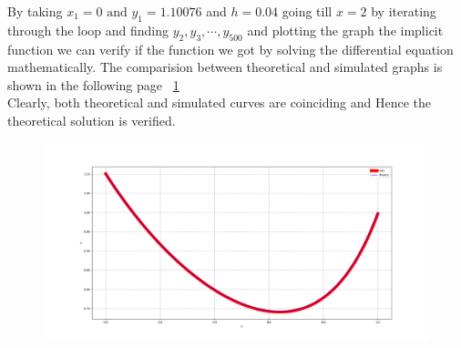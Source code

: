 \documentclass[journal]{IEEEtran}
\begin{document}
By taking $x_1=0 \text{ and } y_1=1.10076$  and $h=0.04$ going till $x=2$ by iterating through the loop and finding $y_2,y_3,\cdots , y_{500}$ and plotting the graph the implicit function we can verify if the function we got by solving the differential equation mathematically.
The comparision between theoretical and simulated graphs is shown in the following page ~\ref{fig:1}\\
Clearly, both theoretical and simulated curves are coinciding and Hence the theoretical solution is verified.
\begin{figure}[ht]
    \centering
    \includegraphics[width=\columnwidth]{figs/Figure_1.png}
    \caption{}
    \label{fig:1}
\end{figure}
\end{document}
